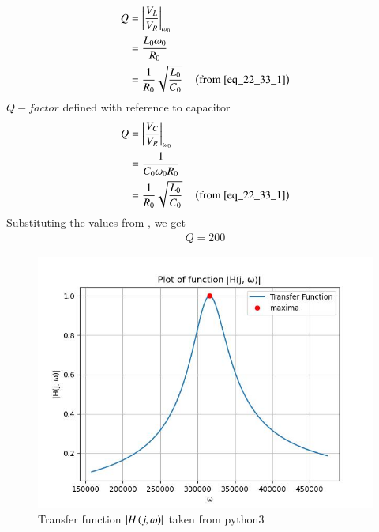 \documentclass[journal,12pt,twocolumn]{IEEEtran}
\theoremstyle{remark}
\begin{document}
\begin{align}
    Q &= \left\vert\frac{V_L}{V_R}\right\vert_{\omega_0}\\
      &= \frac{L_0\omega_0}{R_0}\\
      &= \frac{1}{R_0}\sqrt{\frac{L_0}{C_0}} \quad\left(\text{from \eqref{eq_22_33_1}}\right)
\end{align}
$Q-factor$ defined with reference to capacitor
\begin{align}
    Q &= \left\vert\frac{V_C}{V_R}\right\vert_{\omega_0}\\
      &= \frac{1}{C_0\omega_0R_0}\\
      &= \frac{1}{R_0}\sqrt{\frac{L_0}{C_0}} \quad\left(\text{from \eqref{eq_22_33_1}}\right)
\end{align}
Substituting the values from , we get
\begin{align}
    Q = 200
\end{align}
\begin{figure}
\renewcommand\thefigure{1}
    \centering
    \includegraphics[width=1.0\columnwidth]{figs/fig_1.jpg}
    \caption{Transfer function $\left\vert H\left(j, \omega\right)\right\vert$ taken from python3}
    \label{fig:enter-label}
\end{figure}
\end{document}
